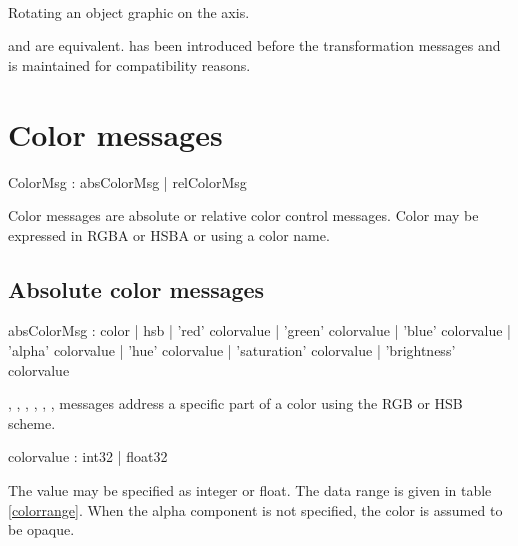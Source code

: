 \documentclass[a4paper,twoside]{report}
\newcommand{\sublevel}[1]	{\section{#1}}
\newcommand{\subsublevel}[1]	{\subsection{#1}}
\begin{document}
\example \\
Rotating an object graphic on the  axis.

\note{}  and  are equivalent.  has been introduced before the transformation messages and is maintained for compatibility reasons.

\sublevel{Color messages}
\label{colors}


\begin{rail}
ColorMsg : 	absColorMsg 
			|	relColorMsg 
\end{rail}

Color messages are absolute or relative color control messages. Color may be expressed in RGBA or HSBA or using a color name.

\subsublevel{Absolute color messages}
\label{abscolor}


\begin{rail}
absColorMsg :    color
			| hsb
			| 'red' colorvalue
			| 'green' colorvalue
			| 'blue' colorvalue
			| 'alpha' colorvalue
			| 'hue' colorvalue
			| 'saturation' colorvalue
			| 'brightness' colorvalue
\end{rail}

, , , , , ,  messages address a specific part of a color using the RGB or HSB scheme.

\begin{rail}
colorvalue :    int32 | float32
\end{rail}

The value may be specified as integer or float. The data range is given in table \ref{colorrange}.
When the alpha component is not specified, the color is assumed to be opaque. 
\end{document}
